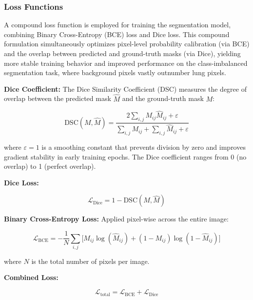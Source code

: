 \subsubsection{Loss Functions}
A compound loss function is employed for training the segmentation model, combining Binary Cross-Entropy (BCE) loss and Dice loss. This compound formulation simultaneously optimizes pixel-level probability calibration (via BCE) and the overlap between predicted and ground-truth masks (via Dice), yielding more stable training behavior and improved performance on the class-imbalanced segmentation task, where background pixels vastly outnumber lung pixels.

\textbf{Dice Coefficient:} The Dice Similarity Coefficient (DSC) measures the degree of overlap between the predicted mask $\hat{M}$ and the ground-truth mask $M$:

\begin{equation}
	\mathrm{DSC}(M,\hat{M}) =
	\frac{2 \sum_{i,j} M_{ij}\hat{M}_{ij} + \varepsilon}
	{\sum_{i,j} M_{ij} + \sum_{i,j} \hat{M}_{ij} + \varepsilon}
	\label{eq:dice_coefficient}
\end{equation}

where $\varepsilon = 1$ is a smoothing constant that prevents division by zero and improves gradient stability in early training epochs. The Dice coefficient ranges from 0 (no overlap) to 1 (perfect overlap).

\textbf{Dice Loss:}

\begin{equation}
	\mathcal{L}_{\mathrm{Dice}} = 1 - \mathrm{DSC}(M,\hat{M})
	\label{eq:dice_loss}
\end{equation}

\textbf{Binary Cross-Entropy Loss:} Applied pixel-wise across the entire image:

\begin{equation}
	\mathcal{L}_{\mathrm{BCE}} =
	-\frac{1}{N} \sum_{i,j}
	\Big[
	M_{ij} \log(\hat{M}_{ij}) +
	(1 - M_{ij}) \log(1 - \hat{M}_{ij})
	\Big]
	\label{eq:bce_loss}
\end{equation}

where $N$ is the total number of pixels per image.

\textbf{Combined Loss:}

\begin{equation}
	\mathcal{L}_{\mathrm{total}} =
	\mathcal{L}_{\mathrm{BCE}} + \mathcal{L}_{\mathrm{Dice}}
	\label{eq:total_loss}
\end{equation}

